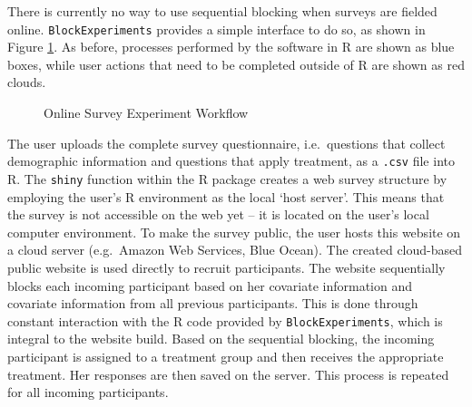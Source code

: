 \documentclass[12pt,]{article}
\begin{document}
There is currently no way to use sequential blocking when surveys are
fielded online. \texttt{BlockExperiments} provides a simple interface to
do so, as shown in Figure \ref{online-workflow}. As before, processes
performed by the software in R are shown as blue boxes, while user
actions that need to be completed outside of R are shown as red clouds.

\vspace{0.4cm}

\begin{figure}[H]
\centering
{}
\caption{Online Survey Experiment Workflow} \label{online-workflow}
\end{figure}

The user uploads the complete survey questionnaire, i.e.~questions that
collect demographic information and questions that apply treatment, as a
\texttt{.csv} file into R. The \texttt{shiny} function within the R
package creates a web survey structure by employing the user's R
environment as the local `host server'. This means that the survey is
not accessible on the web yet -- it is located on the user's local
computer environment. To make the survey public, the user hosts this
website on a cloud server (e.g.~Amazon Web Services, Blue Ocean). The
created cloud-based public website is used directly to recruit
participants. The website sequentially blocks each incoming participant
based on her covariate information and covariate information from all
previous participants. This is done through constant interaction with
the R code provided by \texttt{BlockExperiments}, which is integral to
the website build. Based on the sequential blocking, the incoming
participant is assigned to a treatment group and then receives the
appropriate treatment. Her responses are then saved on the server. This
process is repeated for all incoming participants.
\end{document}
